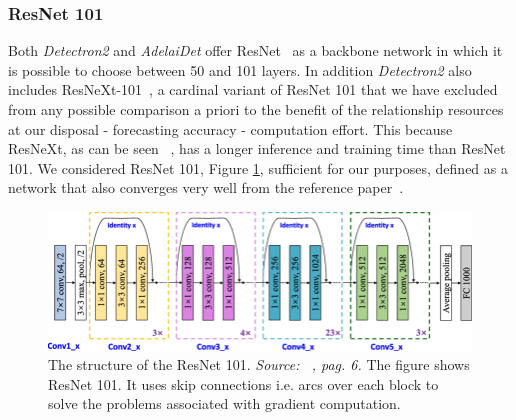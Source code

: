 \documentclass[10pt,twocolumn,letterpaper]{article}
\begin{document}
\subsubsection{ResNet 101}
Both \textit{Detectron2} and \textit{AdelaiDet} offer ResNet~\cite{Authors5_ResNet} as a backbone network in which it is possible to choose between 50 and 101 layers. In addition \textit{Detectron2} also includes ResNeXt-101~\cite{resxt}, a cardinal variant of ResNet 101 that we have excluded from any possible comparison a priori to the benefit of the relationship resources at our disposal - forecasting accuracy - computation effort. This because ResNeXt, as can be seen ~\cite{Authors1_maskrcnn, resxt}, has a longer inference and training time than ResNet 101.
We considered ResNet 101, Figure \ref{fig:resnet101}, sufficient for our purposes, defined as a network that also converges very well from the reference paper~\cite{Authors5_ResNet}.
\begin{figure}[H]
\centering
  \includegraphics[width=0.90\linewidth]{./image/resnet101.png} 
  \caption{The structure of the ResNet 101. \textit{Source: ~\cite{resnet101_img}, pag. 6.}
The figure shows ResNet 101. It uses skip connections i.e. arcs over each block to solve the problems associated with gradient computation.}%
  \label{fig:resnet101}
\noindent
\end{figure}
\end{document}
